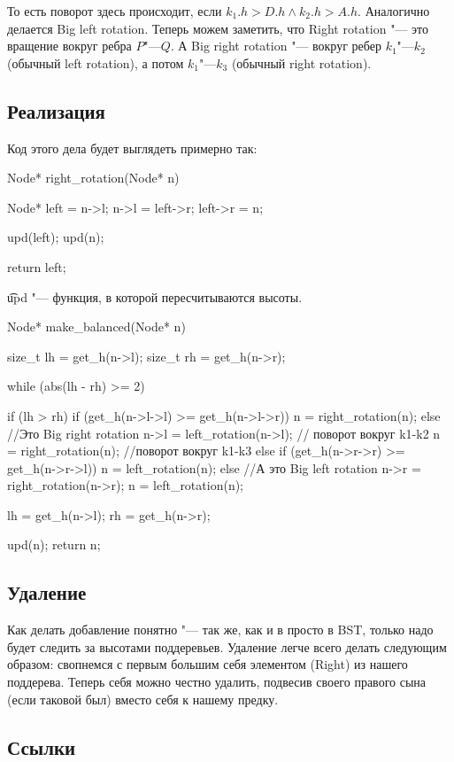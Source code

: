 То есть поворот здесь происходит, если $k_1.h > D.h \land k_2.h > A.h$.
Аналогично делается Big left rotation.
Теперь можем заметить, что Right rotation "--- это вращение вокруг ребра $P$"---$Q$.
А Big right rotation "--- вокруг ребер $k_1$"---$k_2$ (обычный left rotation), а потом $k_1$"---$k_3$ (обычный right rotation).

\subsection{Реализация}

Код этого дела будет выглядеть примерно так:
\begin{cppcode}
Node* right_rotation(Node* n) {
	Node* left = n->l;
	n->l = left->r;
	left->r = n;

	upd(left); upd(n);

	return left;
}
\end{cppcode}
\t{upd} "--- функция, в которой пересчитываются высоты.

\begin{cppcode}
Node* make_balanced(Node* n) {
	size_t lh = get_h(n->l);
	size_t rh = get_h(n->r);

	while (abs(lh - rh) >= 2) {
		if (lh > rh) {
			if (get_h(n->l->l) >= get_h(n->l->r)) {
				n = right_rotation(n);
			} else { //Это Big right rotation
				n->l = left_rotation(n->l); // поворот вокруг k1-k2
				n = right_rotation(n); //поворот вокруг k1-k3
			}
		} else {
			if (get_h(n->r->r) >= get_h(n->r->l)) {
				n = left_rotation(n);
			} else { //А это Big left rotation
				n->r = right_rotation(n->r);
				n = left_rotation(n);
			}
		}

		lh = get_h(n->l);
		rh = get_h(n->r);
	}

	upd(n);
	return n;
}
\end{cppcode}

\subsection{Удаление}

Как делать добавление понятно "--- так же, как и в просто в BST, только надо будет следить за высотами поддеревьев.
Удаление легче всего делать следующим образом: свопнемся с первым большим себя элементом (Right) из нашего поддерева.
Теперь себя можно честно удалить, подвесив своего правого сына (если таковой был) вместо себя к нашему предку.

\subsection{Ссылки}

